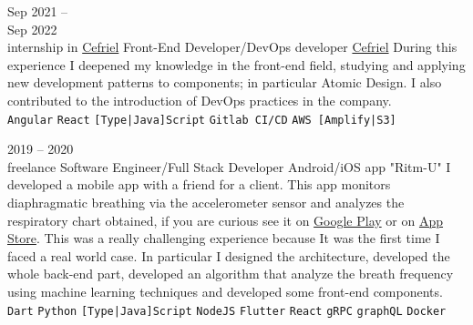 \documentclass[9pt]{developercv} %
\begin{document}
\begin{entrylist}
	\entry
	{Sep 2021 -- \\Sep 2022\\\footnotesize{internship in \href{https://www.cefriel.com/}{Cefriel}}}
	{Front-End Developer/DevOps developer}
	{\href{https://www.cefriel.com/}{Cefriel}}
	{
		During this experience I deepened my knowledge in the front-end field, studying and applying new development patterns to components; in particular Atomic Design.
		\newline I also contributed to the introduction of DevOps practices in the company.
		\\
		\texttt{Angular}\slashsep
		\texttt{React}\slashsep
		\texttt{[Type|Java]Script}\slashsep
		\texttt{Gitlab CI/CD}\slashsep
		\texttt{AWS [Amplify|S3]}
	}
\end{entrylist}

\begin{entrylist}
	\entry
	{2019 -- 2020\\\footnotesize{freelance}}
	{Software Engineer/Full Stack Developer}
	{Android/iOS app "Ritm-U"}
	{
		I developed a mobile app with a friend for a client. This app
		monitors diaphragmatic breathing via the accelerometer sensor
		and analyzes the respiratory chart obtained, if you are curious see
		it on \href{https://play.google.com/store/apps/details?id=com.ritmu.app}{Google Play}
		or on \href{https://apps.apple.com/us/app/id1514766559}{App Store}. This was a really challenging experience
		because It was the first time I faced a real world case. In particular
		I designed the architecture, developed the whole back-end part,
		developed an algorithm that analyze the breath frequency using machine learning techniques and developed some front-end components.
		\\
		\texttt{Dart}\slashsep
		\texttt{Python}\slashsep
		\texttt{[Type|Java]Script}\slashsep
		\texttt{NodeJS}\slashsep
		\texttt{Flutter}\slashsep
		\texttt{React}\slashsep
		\texttt{gRPC}\slashsep
		\texttt{graphQL}\slashsep
		\texttt{Docker}
	}
\end{entrylist}



\end{document}
